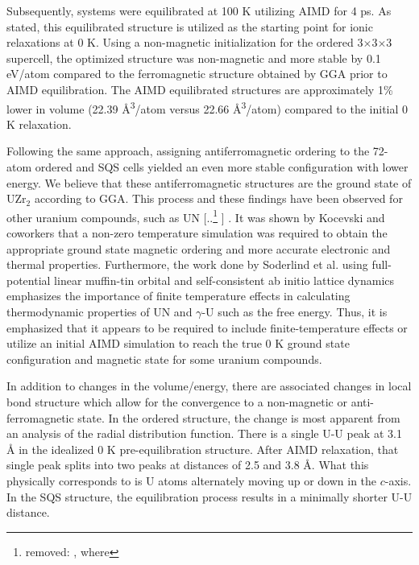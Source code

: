 \documentclass[preprint,12pt]{elsarticle}
\providecommand{\DIFadd}[1]{{\protect\color{blue} \sf #1}} %
\providecommand{\DIFdel}[1]{{\protect\color{red} [..\footnote{removed: #1} ]}} %
\providecommand{\DIFaddbegin}{} %
\providecommand{\DIFaddend}{} %
\providecommand{\DIFdelbegin}{} %
\providecommand{\DIFdelend}{} %
\newcommand{\DIFscaledelfig}{0.5}
\newlength{\DIFdelgraphicswidth} %
\newlength{\DIFdelgraphicsheight} %
\newcommand{\DIFaddincludegraphics}[2][]{{\color{blue}\fbox{\DIFOincludegraphics[#1]{#2}}}} %
\newcommand{\DIFdelincludegraphics}[2][]{%
\sbox{\DIFdelgraphicsbox}{\DIFOincludegraphics[#1]{#2}}%
\settoboxwidth{\DIFdelgraphicswidth}{\DIFdelgraphicsbox} %
\settoboxtotalheight{\DIFdelgraphicsheight}{\DIFdelgraphicsbox} %
\scalebox{\DIFscaledelfig}{%
\parbox[b]{\DIFdelgraphicswidth}{\usebox{\DIFdelgraphicsbox}\\[-\baselineskip] \rule{\DIFdelgraphicswidth}{0em}}\llap{\resizebox{\DIFdelgraphicswidth}{\DIFdelgraphicsheight}{%
\setlength{\unitlength}{\DIFdelgraphicswidth}%
\begin{picture}(1,1)%
\thicklines\linethickness{2pt} %
{\color[rgb]{1,0,0}\put(0,0){\framebox(1,1){}}}%
{\color[rgb]{1,0,0}\put(0,0){\line( 1,1){1}}}%
{\color[rgb]{1,0,0}\put(0,1){\line(1,-1){1}}}%
\end{picture}%
}\hspace*{3pt}}} %
} %
\DeclareRobustCommand{\DIFaddbegin}{\DIFOaddbegin \let\includegraphics\DIFaddincludegraphics} %
\DeclareRobustCommand{\DIFaddend}{\DIFOaddend \let\includegraphics\DIFOincludegraphics} %
\DeclareRobustCommand{\DIFdelbegin}{\DIFOdelbegin \let\includegraphics\DIFdelincludegraphics} %
\DeclareRobustCommand{\DIFdelend}{\DIFOaddend \let\includegraphics\DIFOincludegraphics} %
\begin{document}
Subsequently, systems were equilibrated at 100 K utilizing AIMD for 4 ps. As stated, this equilibrated structure is utilized as the starting point for ionic relaxations at 0 K. Using a non-magnetic initialization for the ordered 3$\times$3$\times$3 supercell, the optimized structure was non-magnetic and more stable by 0.1 eV/atom compared to the ferromagnetic structure obtained by GGA prior to AIMD equilibration. The AIMD equilibrated structures are approximately 1\% lower in volume (22.39 {\AA}\textsuperscript{3}/atom versus 22.66 {\AA}\textsuperscript{3}/atom) compared to the initial 0 K relaxation. %


Following the same approach, assigning antiferromagnetic ordering to the 72-atom ordered and SQS cells yielded an even more stable configuration with lower energy. We believe that these antiferromagnetic structures are the ground state of UZr$_2$ according to GGA. This process and these findings have been observed for other uranium compounds, such as UN \DIFdelbegin \DIFdel{\cite{kocevski_finite_2023}, where }\DIFdelend \DIFaddbegin \DIFadd{\cite{ kocevski_finite_2023}. It was shown by Kocevski and coworkers \cite{kocevski_finite_2023} that }\DIFaddend a non-zero temperature simulation was required to obtain the appropriate ground state magnetic ordering and more accurate electronic and thermal properties. \DIFaddbegin \DIFadd{Furthermore, the work done by Soderlind et al.\cite{soderlind_ground-state_2019, soderlind_high-temperature_2023} using full-potential linear muffin-tin orbital and self-consistent ab initio lattice dynamics emphasizes the importance of finite temperature effects in calculating thermodynamic properties of UN and $\gamma$-U such as the free energy. }\DIFaddend Thus, it is emphasized that it appears to be required to \DIFaddbegin \DIFadd{include finite-temperature effects or }\DIFaddend utilize an initial AIMD simulation to reach the true 0 K ground state configuration and magnetic state for some uranium compounds. 

In addition to changes in the volume/energy, there are associated changes in local bond structure which allow for the convergence to a non-magnetic or anti-ferromagnetic state. In the ordered structure, the change is most apparent from an analysis of the radial distribution function. There is a single U-U peak at 3.1 {\AA} in the idealized 0 K pre-equilibration structure. After AIMD relaxation, that single peak splits into two peaks at distances of 2.5 and 3.8 {\AA}. What this physically corresponds to is U atoms alternately moving up or down in the $c$-axis. In the SQS structure, the equilibration process results in a minimally shorter U-U distance.
\end{document}
